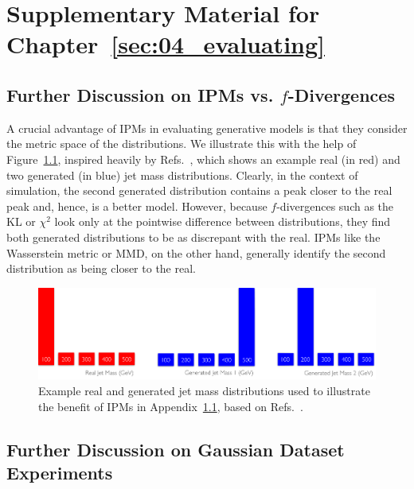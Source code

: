\chapter{Supplementary Material for Chapter~\ref{sec:04_evaluating}}

\section{Further Discussion on IPMs vs. \texorpdfstring{$f$}{f}-Divergences}
\label{app:04_evaluating_metricspace} 

A crucial advantage of IPMs in evaluating generative models is that they consider the metric space of the distributions.
We illustrate this with the help of Figure~\ref{fig:04_evaluating_metricspace}, inspired heavily by Refs.~\cite{gretton_talk, w1_stackoverflow}, which shows an example real (in red) and two generated (in blue) jet mass distributions.
Clearly, in the context of simulation, the second generated distribution contains a peak closer to the real peak and, hence, is a better model.
However, because $f$-divergences such as the KL or $\chi^2$ look only at the pointwise difference between distributions, they find both generated distributions to be as discrepant with the real.
IPMs like the Wasserstein metric or MMD, on the other hand, generally identify the second distribution as being closer to the real.

\begin{figure}[htpb]
    \includegraphics[width=\textwidth]{figures/04-ML4Sim/evaluating/metricspace.pdf}
    \caption{Example real and generated jet mass distributions used to illustrate the benefit of IPMs in Appendix~\ref{app:04_evaluating_metricspace}, based on Refs.~\cite{gretton_talk, w1_stackoverflow}.}
    \label{fig:04_evaluating_metricspace}
\end{figure}

\section{Further Discussion on Gaussian Dataset Experiments}
\label{app:04_evaluating_details} 

